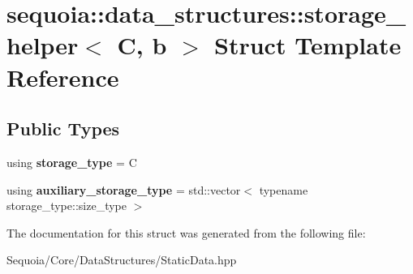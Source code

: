 \hypertarget{structsequoia_1_1data__structures_1_1storage__helper}{}\section{sequoia\+::data\+\_\+structures\+::storage\+\_\+helper$<$ C, b $>$ Struct Template Reference}
\label{structsequoia_1_1data__structures_1_1storage__helper}
\subsection*{Public Types}
\begin{DoxyCompactItemize}
\item 
\mbox{\label{structsequoia_1_1data__structures_1_1storage__helper_a1b039955f60cddecf7e43c4f978081b6}} 
using {\bfseries storage\+\_\+type} = C
\item 
\mbox{\label{structsequoia_1_1data__structures_1_1storage__helper_af3dfbe3f2829360144e5e029cf0e4e07}} 
using {\bfseries auxiliary\+\_\+storage\+\_\+type} = std\+::vector$<$ typename storage\+\_\+type\+::size\+\_\+type $>$
\end{DoxyCompactItemize}


The documentation for this struct was generated from the following file\+:\begin{DoxyCompactItemize}
\item 
Sequoia/\+Core/\+Data\+Structures/Static\+Data.\+hpp\end{DoxyCompactItemize}
